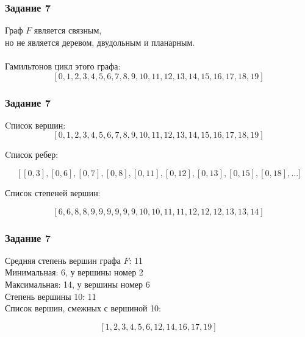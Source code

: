 \documentclass[c]{beamer}  %
\begin{document}
\begin{frame}
\frametitle{Задание 7}
Граф $F$ является связным,\\
но не является деревом, двудольным и планарным.\\ \\

Гамильтонов цикл этого графа: 
\[\displaystyle 
\left[ 0\operatorname{,}1\operatorname{,}2\operatorname{,}3\operatorname{,}4\operatorname{,}5\operatorname{,}6\operatorname{,}7\operatorname{,}8\operatorname{,}9\operatorname{,}10\operatorname{,}11\operatorname{,}12\operatorname{,}13\operatorname{,}14\operatorname{,}15\operatorname{,}16\operatorname{,}17\operatorname{,}18\operatorname{,}19\right] \mbox{}
\]

\end{frame}


\begin{frame}
\frametitle{Задание 7}
Cписок вершин:
\[\displaystyle
\left[ 0\operatorname{,}1\operatorname{,}2\operatorname{,}3\operatorname{,}4\operatorname{,}5\operatorname{,}6\operatorname{,}7\operatorname{,}8\operatorname{,}9\operatorname{,}10\operatorname{,}11\operatorname{,}12\operatorname{,}13\operatorname{,}14\operatorname{,}15\operatorname{,}16\operatorname{,}17\operatorname{,}18\operatorname{,}19\right] \mbox{}
\]


Cписок ребер:

\[\displaystyle 
\operatorname{[}\left[ 0\operatorname{,}3\right] \operatorname{,}\left[ 0\operatorname{,}6\right] \operatorname{,}\left[ 0\operatorname{,}7\right] \operatorname{,}\left[ 0\operatorname{,}8\right] \operatorname{,}\left[ 0\operatorname{,}11\right] \operatorname{,}\left[ 0\operatorname{,}12\right] \operatorname{,}\left[ 0\operatorname{,}13\right] \operatorname{,}\left[ 0\operatorname{,}15\right] \operatorname{,}\left[ 0\operatorname{,}18\right] \operatorname{,
} ...]\]

Список степеней вершин:

\[\displaystyle  
\left[ 6\operatorname{,}6\operatorname{,}8\operatorname{,}8\operatorname{,}9\operatorname{,}9\operatorname{,}9\operatorname{,}9\operatorname{,}9\operatorname{,}9\operatorname{,}10\operatorname{,}10\operatorname{,}11\operatorname{,}11\operatorname{,}12\operatorname{,}12\operatorname{,}12\operatorname{,}13\operatorname{,}13\operatorname{,}14\right] \mbox{}
\]
\end{frame}
\begin{frame}
\frametitle{Задание 7}

Средняя степень вершин графа $F$:      11\\
Минимальная:      6, у вершины номер 2\\
Максимальная:      14, у вершины номер 6\\
Степень вершины 10:     11\\
Список вершин, смежных с вершиной 10:

\[\displaystyle 
\left[ 1\operatorname{,}2\operatorname{,}3\operatorname{,}4\operatorname{,}5\operatorname{,}6\operatorname{,}12\operatorname{,}14\operatorname{,}16\operatorname{,}17\operatorname{,}19\right] \mbox{}
\]
\end{frame}
\end{document}
